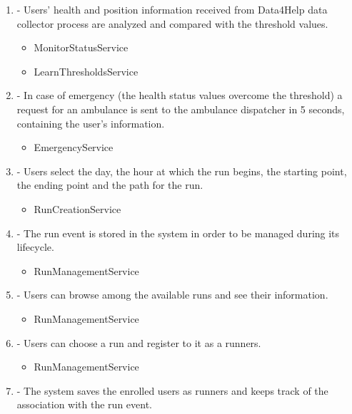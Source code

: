 \documentclass[a4paper]{article}
\begin{document}
\begin{enumerate}[label*=\bf{R.\arabic*}]
\item - Users’ health and position information received from Data4Help data collector process are analyzed and compared with the threshold values.

\begin{itemize}
\item MonitorStatusService
\item LearnThresholdsService
\end{itemize}

\item - In case of emergency (the health status values overcome the threshold) a request for an ambulance is sent to the ambulance dispatcher in 5 seconds, containing the user’s information.

\begin{itemize}
\item EmergencyService
\end{itemize}

\item - Users select the day, the hour at which the run begins, the starting point, the ending point and the path for the run.

\begin{itemize}
\item RunCreationService
\end{itemize}

\item - The run event is stored in the system in order to be managed during its lifecycle.

\begin{itemize}
\item RunManagementService
\end{itemize}

\item - Users can browse among the available runs and see their information.

\begin{itemize}
\item RunManagementService
\end{itemize}

\item - Users can choose a run and register to it as a runners.

\begin{itemize}
\item RunManagementService
\end{itemize}

\item - The system saves the enrolled users as runners and keeps track of the association with the run event.


\end{enumerate}
\end{document}
